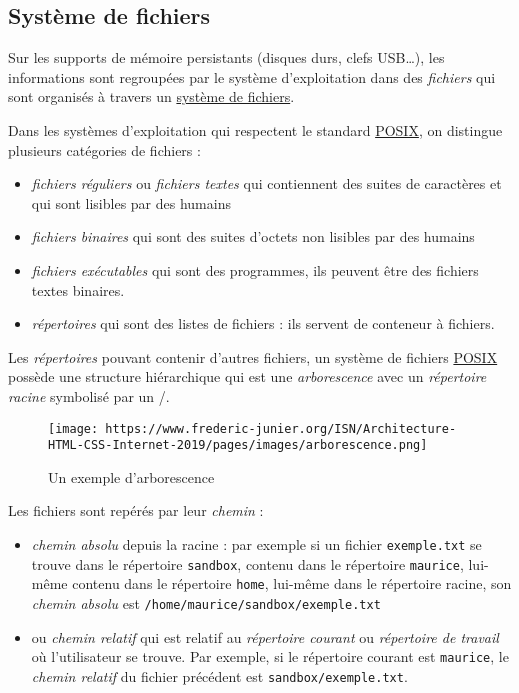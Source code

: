 \documentclass[
  11pt,
]{article}
\providecommand{\tightlist}{%
  \setlength{\itemsep}{0pt}\setlength{\parskip}{0pt}}
\newcounter{prog}
\begin{document}
\hypertarget{systuxe8me-de-fichiers}{%
\subsection{Système de fichiers}\label{systuxe8me-de-fichiers}}

Sur les supports de mémoire persistants (disques durs, clefs USB\ldots),
les informations sont regroupées par le système d'exploitation dans des
\emph{fichiers} qui sont organisés à travers un
\href{https://fr.wikipedia.org/wiki/Syst\%C3\%A8me_de_fichiers}{système
de fichiers}.

Dans les systèmes d'exploitation qui respectent le standard
\href{https://fr.wikipedia.org/wiki/POSIX}{POSIX}, on distingue
plusieurs catégories de fichiers :

\begin{itemize}
\tightlist
\item
  \emph{fichiers réguliers} ou \emph{fichiers textes} qui contiennent
  des suites de caractères et qui sont lisibles par des humains
\item
  \emph{fichiers binaires} qui sont des suites d'octets non lisibles par
  des humains
\item
  \emph{fichiers exécutables} qui sont des programmes, ils peuvent être
  des fichiers textes binaires.
\item
  \emph{répertoires} qui sont des listes de fichiers : ils servent de
  conteneur à fichiers.
\end{itemize}

Les \emph{répertoires} pouvant contenir d'autres fichiers, un système de
fichiers \href{https://fr.wikipedia.org/wiki/POSIX}{POSIX} possède une
structure hiérarchique qui est une \emph{arborescence} avec un
\emph{répertoire racine} symbolisé par un /.

\begin{figure}
\centering
\texttt{[image: https://www.frederic-junier.org/ISN/Architecture-HTML-CSS-Internet-2019/pages/images/arborescence.png]}
\caption{Un exemple d'arborescence}
\end{figure}

Les fichiers sont repérés par leur \emph{chemin} :

\begin{itemize}
\item
  \emph{chemin absolu} depuis la racine : par exemple si un fichier
  \texttt{exemple.txt} se trouve dans le répertoire \texttt{sandbox},
  contenu dans le répertoire \texttt{maurice}, lui-même contenu dans le
  répertoire \texttt{home}, lui-même dans le répertoire racine, son
  \emph{chemin absolu} est \texttt{/home/maurice/sandbox/exemple.txt}
\item
  ou \emph{chemin relatif} qui est relatif au \emph{répertoire courant}
  ou \emph{répertoire de travail} où l'utilisateur se trouve. Par
  exemple, si le répertoire courant est \texttt{maurice}, le
  \emph{chemin relatif} du fichier précédent est
  \texttt{sandbox/exemple.txt}.
\end{itemize}
\end{document}
